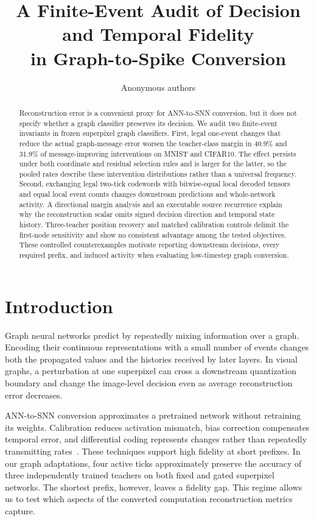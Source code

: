 \documentclass[10pt,twocolumn,letterpaper]{article}
\title{A Finite-Event Audit of Decision and Temporal Fidelity\\in Graph-to-Spike Conversion}
\author{Anonymous authors}
\begin{document}
\maketitle
\begin{abstract}
Reconstruction error is a convenient proxy for ANN-to-SNN conversion, but it does not specify whether a graph classifier preserves its decision. We audit two finite-event invariants in frozen superpixel graph classifiers. First, legal one-event changes that reduce the actual graph-message error worsen the teacher-class margin in 40.9\% and 31.9\% of message-improving interventions on MNIST and CIFAR10. The effect persists under both coordinate and residual selection rules and is larger for the latter, so the pooled rates describe these intervention distributions rather than a universal frequency. Second, exchanging legal two-tick codewords with bitwise-equal local decoded tensors and equal local event counts changes downstream predictions and whole-network activity. A directional margin analysis and an executable source recurrence explain why the reconstruction scalar omits signed decision direction and temporal state history. Three-teacher position recovery and matched calibration controls delimit the first-node sensitivity and show no consistent advantage among the tested objectives. These controlled counterexamples motivate reporting downstream decisions, every required prefix, and induced activity when evaluating low-timestep graph conversion.
\end{abstract}

\section{Introduction}
Graph neural networks predict by repeatedly mixing information over a graph. Encoding their continuous representations with a small number of events changes both the propagated values and the histories received by later layers. In visual graphs, a perturbation at one superpixel can cross a downstream quantization boundary and change the image-level decision even as average reconstruction error decreases.

ANN-to-SNN conversion approximates a pretrained network without retraining its weights. Calibration reduces activation mismatch, bias correction compensates temporal error, and differential coding represents changes rather than repeatedly transmitting rates~\cite{li2021,wu2024ftbc,huang2025}. These techniques support high fidelity at short prefixes. In our graph adaptations, four active ticks approximately preserve the accuracy of three independently trained teachers on both fixed and gated superpixel networks. The shortest prefix, however, leaves a fidelity gap. This regime allows us to test which aspects of the converted computation reconstruction metrics capture.
\end{document}
